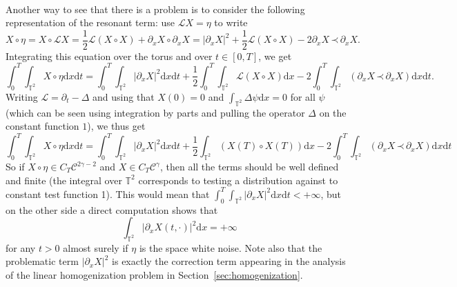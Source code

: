 \documentclass[a4paper,11pt]{article}
\newcommand{\mathd}{\mathrm{d}}
\newcommand{\noplus}{}
\newcommand{\LL}{\mathscr{L}}
\newcommand{\CC}{\mathscr{C}}
\newcommand{\lpara}{\,\mathord{\prec}\,}
\newcommand{\reso}{\,\mathord{\circ}\,}
\begin{document}
\

Another way to see that there is a problem is to consider the following
representation of the resonant term: use $\LL X = \eta$ to write
\[ X \reso \eta = X \reso \LL X = \frac{1}{2} \LL (X \reso X) + \partial_x X
   \reso \partial_x X = | \partial_x X |^2 + \frac{1}{2} \LL (X \reso X) - 2
   \partial_x X \lpara \partial_x X. \]
Integrating this equation over the torus and over $t \in [0, T]$, we get
\[
   \int_0^T \int_{\mathbb{T}^2} X \reso \eta \mathd x \mathd t  = \int_0^T \int_{\mathbb{T}^2} | \partial_x X |^2 \mathd x \mathd t + \frac{1}{2} \int_0^T \int_{\mathbb{T}^2} \LL (X \reso X ) \mathd x - 2 \int_0^T \int_{\mathbb{T}^2} (\partial_x X \lpara \partial_x X) \mathd x \mathd t.
\]
Writing $\LL = \partial_t - \Delta$ and using that $X(0) = 0$ and $\int_{\mathbb{T}^2} \Delta \psi \mathd x = 0$ for all $\psi$ (which can be seen using integration by parts and pulling the operator $\Delta$ on the constant function $1$), we thus get
\[
   \int_0^T \int_{\mathbb{T}^2} X \reso \eta \mathd x \mathd t  = \int_0^T \int_{\mathbb{T}^2} | \partial_x X |^2 \mathd x \mathd t + \frac{1}{2} \int_{\mathbb{T}^2} (X (T) \reso X (T)) \mathd x - 2 \int_0^T \int_{\mathbb{T}^2} (\partial_x X \lpara \partial_x X) \mathd x \mathd t
\]
So if $X \reso \eta \in C_T \CC^{2 \gamma - 2}$ and $X \in C_T
\CC^{\gamma}$, then all the terms should be well defined and finite (the integral over $\mathbb{T}^2$ corresponds to testing a distribution against to constant test function 1). This would mean that $\int_0^T \int_{\mathbb{T}^2} | \partial_x X |^2 \mathd x \mathd t < \noplus + \infty$, but on the other side a direct computation shows that
\[
   \int_{\mathbb{T}^2} | \partial_x X (t, \cdot) |^2 \mathd x = + \infty
\]
for any $t > 0$ almost surely if $\eta$ is the space white noise. Note also
that the problematic term $| \partial_x X |^2$ is exactly the correction term
appearing in the analysis of the linear homogenization problem in Section~\ref{sec:homogenization}.

\
\end{document}

